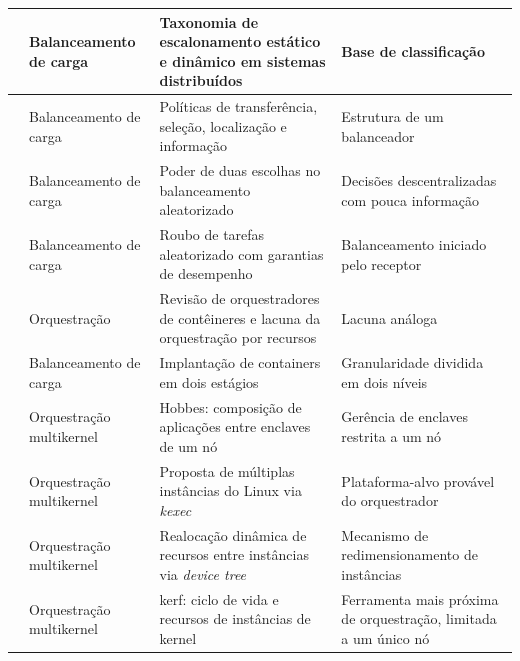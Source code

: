 \begin{small}
\begin{longtable}{p{3cm} p{2.5cm} p{4.75cm} p{3.75cm}}
        \citet{casavant1988taxonomy} & Balanceamento de carga & Taxonomia de escalonamento estático e dinâmico em sistemas distribuídos & Base de classificação \\
        \midrule
        \citet{shivaratri1992load} & Balanceamento de carga & Políticas de transferência, seleção, localização e informação & Estrutura de um balanceador \\
        \midrule
        \citet{mitzenmacher2001power} & Balanceamento de carga & Poder de duas escolhas no balanceamento aleatorizado & Decisões descentralizadas com pouca informação \\
        \midrule
        \citet{blumofe1999work} & Balanceamento de carga & Roubo de tarefas aleatorizado com garantias de desempenho & Balanceamento iniciado pelo receptor \\
        \midrule
        \citet{swetha2025resource} & Orquestração & Revisão de orquestradores de contêineres e lacuna da orquestração por recursos & Lacuna análoga \\
        \midrule
        \citet{lu2025optimized} & Balanceamento de carga & Implantação de containers em dois estágios & Granularidade dividida em dois níveis \\
        \midrule

        \citet{kocoloski2015composition} & Orquestração multikernel & Hobbes: composição de aplicações entre enclaves de um nó & Gerência de enclaves restrita a um nó \\
        \midrule
        \citet{wang2025multikernel} & Orquestração multikernel & Proposta de múltiplas instâncias do Linux via \textit{kexec} & Plataforma-alvo provável do orquestrador \\
        \midrule
        \citet{wang2025lpc} & Orquestração multikernel & Realocação dinâmica de recursos entre instâncias via \textit{device tree} & Mecanismo de redimensionamento de instâncias \\
        \midrule
        \citet{multikernel2025kerf} & Orquestração multikernel & kerf: ciclo de vida e recursos de instâncias de kernel & Ferramenta mais próxima de orquestração, limitada a um único nó \\
        \midrule


\end{longtable}
\end{small}
